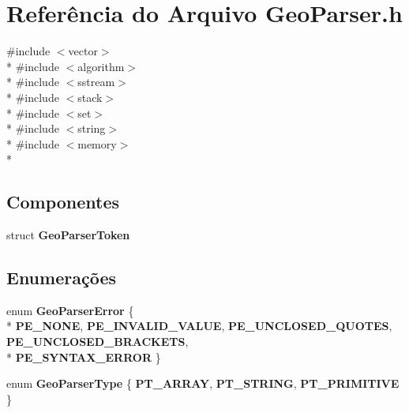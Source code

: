 \section{Referência do Arquivo Geo\+Parser.\+h}
\label{_geo_parser_8h}
{\ttfamily \#include $<$vector$>$}\\*
{\ttfamily \#include $<$algorithm$>$}\\*
{\ttfamily \#include $<$sstream$>$}\\*
{\ttfamily \#include $<$stack$>$}\\*
{\ttfamily \#include $<$set$>$}\\*
{\ttfamily \#include $<$string$>$}\\*
{\ttfamily \#include $<$memory$>$}\\*
\subsection*{Componentes}
\begin{DoxyCompactItemize}
\item 
struct {\bf Geo\+Parser\+Token}
\end{DoxyCompactItemize}
\subsection*{Enumerações}
\begin{DoxyCompactItemize}
\item 
enum {\bf Geo\+Parser\+Error} \{ \\*
{\bf P\+E\+\_\+\+N\+O\+NE}, 
{\bf P\+E\+\_\+\+I\+N\+V\+A\+L\+I\+D\+\_\+\+V\+A\+L\+UE}, 
{\bf P\+E\+\_\+\+U\+N\+C\+L\+O\+S\+E\+D\+\_\+\+Q\+U\+O\+T\+ES}, 
{\bf P\+E\+\_\+\+U\+N\+C\+L\+O\+S\+E\+D\+\_\+\+B\+R\+A\+C\+K\+E\+TS}, 
\\*
{\bf P\+E\+\_\+\+S\+Y\+N\+T\+A\+X\+\_\+\+E\+R\+R\+OR}
 \}
\item 
enum {\bf Geo\+Parser\+Type} \{ {\bf P\+T\+\_\+\+A\+R\+R\+AY}, 
{\bf P\+T\+\_\+\+S\+T\+R\+I\+NG}, 
{\bf P\+T\+\_\+\+P\+R\+I\+M\+I\+T\+I\+VE}
 \}
\end{DoxyCompactItemize}
